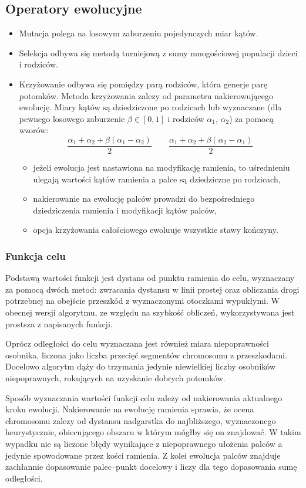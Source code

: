 \documentclass[11pt, leqno]{article}
\begin{document}
\subsection{Operatory ewolucyjne}

\begin{itemize}
	\item Mutacja polega na losowym zaburzeniu pojedynczych miar kątów.
	\item Selekcja odbywa się metodą turniejową z sumy mnogościowej populacji dzieci i rodziców.
	\item Krzyżowanie odbywa się pomiędzy parą rodziców, która generje parę potomków. Metoda krzyżowania zalezy od parametru nakierowującego ewolucję. Miary kątów są dziedziczone po rodzicach lub wyznaczane (dla pewnego losowego zaburzenie $\beta\in[0, 1]$ i rodziców $\alpha_1$, $\alpha_2$) za pomocą wzorów:
	\[
		\frac{\alpha_1 + \alpha_2 + \beta(\alpha_1 - \alpha_2)}{2} \quad\quad \frac{\alpha_1 + \alpha_2 + \beta(\alpha_2 - \alpha_1)}{2}
	\]
	\begin{itemize}
		\item jeżeli ewolucja jest nastawiona na modyfikację ramienia, to uśrednieniu ulegają wartości kątów ramienia a palce są dziedziczne po rodzicach,
		\item nakierowanie na ewolucję palców prowadzi do bezpośredniego dziedziczenia ramienia i modyfikacji kątów palców,
		\item opcja krzyżowania całościowego ewoluuje wszystkie stawy kończyny.
	\end{itemize}
\end{itemize}

\subsubsection{Funkcja celu}
Podstawą wartości funkcji jest dystans od punktu ramienia do celu, wyznaczany za pomocą dwóch metod: zwracania dystansu w linii prostej oraz obliczania drogi potrzebnej na obejście przeszkód z wyznaczonymi otoczkami wypukłymi. W obecnej wersji algorytmu, ze względu na szybkość obliczeń, wykorzystywana jest prostsza z napisanych funkcji.

Oprócz odległości do celu wyznaczana jest również miara niepoprawności osobnika, liczona jako liczba przecięć segmentów chromosomu z przeszkodami. Docelowo algorytm dąży do trzymania jedynie niewielkiej liczby osobników niepoprawnych, rokujących na uzyskanie dobrych potomków.

Sposób wyznaczania wartości funkcji celu zależy od nakierowania aktualnego kroku ewolucji. Nakierowanie na ewolucję ramienia sprawia, że ocena chromosomu zalezy od dystansu nadgarstka do najbliższego, wyznaczonego heurystycznie, obiecującego obszaru w którym mógłby się on znajdować. W takim wypadku nie są liczone błędy wynikające z niepoprawnego ułożenia palców a jedynie spowodowane przez kości ramienia. Z kolei ewolucja palców znajduje zachłannie dopasowanie palec--punkt docelowy i liczy dla tego dopasowania sumę odległości.
\end{document}
